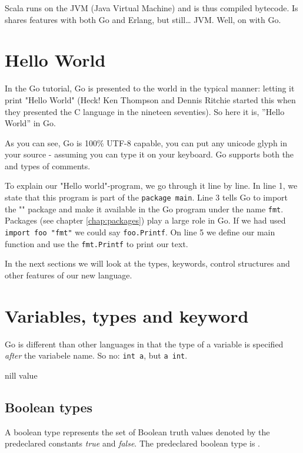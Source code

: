 Scala runs on the JVM (Java Virtual Machine) and is thus compiled 
bytecode. Is shares features with both Go and Erlang, but still\ldots
JVM.  Well, on with Go.


\section{Hello World}
\label{sec:hello world}
In the Go tutorial, Go is presented to the world in the typical
manner: letting it print "Hello World" (Heck! Ken Thompson and
Dennis Ritchie started this when they presented the C language in 
the nineteen seventies).
So here it is, ''Hello World'' in Go.


As you can see, Go is 100\% UTF-8 capable, you can put any unicode
glyph in your source - assuming you can type it on your keyboard.
Go supports both the \texttt{\rem{/* */}} and \texttt{\rem{//}} types of comments. 

To explain our "Hello
world"-program, we go through it line by line. In line 1, we state
that this program is part of the \lstinline{package main}. Line 3
tells Go to import the "" package and make it available
in the Go program under the name \lstinline{fmt}. Packages (see chapter
\ref{chap:packages}) play a large role in Go.
If we had used
\lstinline{import foo "fmt"} we could say \lstinline{foo.Printf}. On
line 5 we define our main function and use the \lstinline{fmt.Printf} to
print our text.

In the next sections we will look at the types, keywords, control structures
and other features of our new language. 

\section{Variables, types and keyword}
Go is different than other languages in that the type of a variable
is specified \emph{after} the variabele name. So no: 
\lstinline{int a}, but \lstinline{a int}.

nill value

\subsection{Boolean types}
A boolean type represents the set of Boolean truth values denoted by the
predeclared constants \emph{true} and \emph{false}. The predeclared boolean type is .

